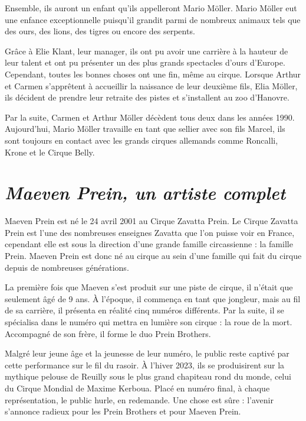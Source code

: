 Ensemble, ils auront un enfant qu’ils appelleront Mario Möller. Mario Möller eut une enfance exceptionnelle puisqu’il grandit parmi de nombreux animaux tels que des ours, des lions, des tigres ou encore des serpents.

Grâce à Elie Klant, leur manager, ils ont pu avoir une carrière à la hauteur de leur talent et ont pu présenter un des plus grands spectacles d’ours d’Europe. Cependant, toutes les bonnes choses ont une fin, même au cirque. Lorsque Arthur et Carmen s’apprêtent à accueillir la naissance de leur deuxième fils, Elia Möller, ils décident de prendre leur retraite des pistes et s’installent au zoo d'Hanovre.

Par la suite, Carmen et Arthur Möller décèdent tous deux dans les années 1990. Aujourd'hui, Mario Möller travaille en tant que sellier avec son fils Marcel, ils sont toujours en contact avec les grands cirques allemands comme Roncalli, Krone et le Cirque Belly.

\section*{\textit{Maeven Prein, un artiste complet}}

Maeven Prein est né le 24 avril 2001 au Cirque Zavatta Prein. Le Cirque Zavatta Prein est l’une des nombreuses enseignes Zavatta que l’on puisse voir en France, cependant elle est sous la direction d’une grande famille circassienne : la famille Prein. Maeven Prein est donc né au cirque au sein d’une famille qui fait du cirque depuis de nombreuses générations.

La première fois que Maeven s'est produit sur une piste de cirque, il n’était que seulement âgé de 9 ans. À l’époque, il commença en tant que jongleur, mais au fil de sa carrière, il présenta en réalité cinq numéros différents. Par la suite, il se spécialisa dans le numéro qui mettra en lumière son cirque : la roue de la mort. Accompagné de son frère, il forme le duo Prein Brothers.

Malgré leur jeune âge et la jeunesse de leur numéro, le public reste captivé par cette performance sur le fil du rasoir. À l’hiver 2023, ils se produisirent sur la mythique pelouse de Reuilly sous le plus grand chapiteau rond du monde, celui du Cirque Mondial de Maxime Kerboua. Placé en numéro final, à chaque représentation, le public hurle, en redemande. Une chose est sûre : l’avenir s’annonce radieux pour les Prein Brothers et pour Maeven Prein.

